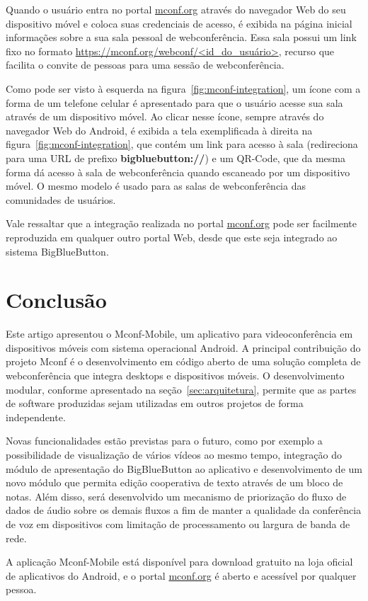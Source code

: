\documentclass{acm_proc_article-sp}
\begin{document}
Quando o usuário entra no portal \url{mconf.org} através do navegador Web do seu dispositivo móvel e coloca suas credenciais de acesso, é exibida na página inicial informações sobre a sua sala pessoal de webconferência. Essa sala possui um link fixo no formato \url{https://mconf.org/webconf/<id\_do\_usuário>}, recurso que facilita o convite de pessoas para uma sessão de webconferência.

Como pode ser visto à esquerda na figura~\ref{fig:mconf-integration}, um ícone com a forma de um telefone celular é apresentado para que o usuário acesse sua sala através de um dispositivo móvel. Ao clicar nesse ícone, sempre através do navegador Web do Android, é exibida a tela exemplificada à direita na figura~\ref{fig:mconf-integration}, que contém um link para acesso à sala (redireciona para uma URL de prefixo \textbf{bigbluebutton://}) e um QR-Code, que da mesma forma dá acesso à sala de webconferência quando escaneado por um dispositivo móvel. O mesmo modelo é usado para as salas de webconferência das comunidades de usuários.

Vale ressaltar que a integração realizada no portal \url{mconf.org} pode ser facilmente reproduzida em qualquer outro portal Web, desde que este seja integrado ao sistema BigBlueButton.

\section{Conclusão}

Este artigo apresentou o Mconf-Mobile, um aplicativo para videoconferência em dispositivos móveis com sistema operacional Android. A principal contribuição do projeto Mconf é o desenvolvimento em código aberto de uma solução completa de webconferência que integra desktops e dispositivos móveis. O desenvolvimento modular, conforme apresentado na seção~\ref{sec:arquitetura}, permite que as partes de software produzidas sejam utilizadas em outros projetos de forma independente.

Novas funcionalidades estão previstas para o futuro, como por exemplo a possibilidade de visualização de vários vídeos ao mesmo tempo, integração do módulo de apresentação do BigBlueButton ao aplicativo e desenvolvimento de um novo módulo que permita edição cooperativa de texto através de um bloco de notas. Além disso, será desenvolvido um mecanismo de priorização do fluxo de dados de áudio sobre os demais fluxos a fim de manter a qualidade da conferência de voz em dispositivos com limitação de processamento ou largura de banda de rede. 

A aplicação Mconf-Mobile está disponível para download gratuito na loja oficial de aplicativos do Android, e o portal \url{mconf.org} é aberto e acessível por qualquer pessoa.

%

%
%
\balancecolumns
\end{document}
